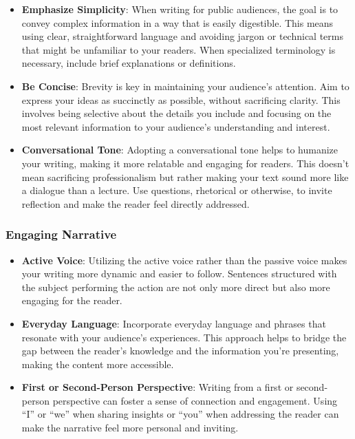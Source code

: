 \documentclass[
]{book}
\begin{document}
\begin{itemize}
\item
  \textbf{Emphasize Simplicity}: When writing for public audiences, the goal is to convey complex information in a way that is easily digestible. This means using clear, straightforward language and avoiding jargon or technical terms that might be unfamiliar to your readers. When specialized terminology is necessary, include brief explanations or definitions.
\item
  \textbf{Be Concise}: Brevity is key in maintaining your audience's attention. Aim to express your ideas as succinctly as possible, without sacrificing clarity. This involves being selective about the details you include and focusing on the most relevant information to your audience's understanding and interest.
\item
  \textbf{Conversational Tone}: Adopting a conversational tone helps to humanize your writing, making it more relatable and engaging for readers. This doesn't mean sacrificing professionalism but rather making your text sound more like a dialogue than a lecture. Use questions, rhetorical or otherwise, to invite reflection and make the reader feel directly addressed.
\end{itemize}

\hypertarget{engaging-narrative}{%
\subsubsection*{Engaging Narrative}\label{engaging-narrative}}

\begin{itemize}
\item
  \textbf{Active Voice}: Utilizing the active voice rather than the passive voice makes your writing more dynamic and easier to follow. Sentences structured with the subject performing the action are not only more direct but also more engaging for the reader.
\item
  \textbf{Everyday Language}: Incorporate everyday language and phrases that resonate with your audience's experiences. This approach helps to bridge the gap between the reader's knowledge and the information you're presenting, making the content more accessible.
\item
  \textbf{First or Second-Person Perspective}: Writing from a first or second-person perspective can foster a sense of connection and engagement. Using ``I'' or ``we'' when sharing insights or ``you'' when addressing the reader can make the narrative feel more personal and inviting.
\end{itemize}
\end{document}
